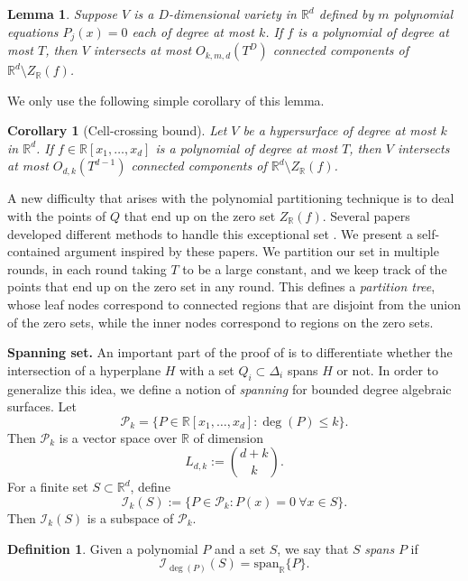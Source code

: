 \documentclass[11pt]{article}
\theoremstyle{plain}
\newtheorem{corollary}[theorem]{Corollary}
\newtheorem{lemma}[theorem]{Lemma}
\theoremstyle{definition}
\newtheorem{definition}{Definition}
\begin{document}
	\begin{lemma}
		Suppose $V$ is a $D$-dimensional variety in $\mathbb{R}^d$ defined by $m$
		polynomial equations $P_j (x) = 0$ each of degree at most $k$. If $f$ is a polynomial of degree at most $T$, then $V$ intersects at most $O_{k,m,d}(T^D)$ connected components of $\mathbb{R}^d\setminus Z_{\mathbb{R}}(f)$.
	\end{lemma}
	
	We only use the following simple corollary of this lemma.
	
	\begin{corollary}[Cell-crossing bound]\label{lemma:cell_crossing}
		Let $V$ be a hypersurface of degree at most $k$ in $\mathbb{R}^d$. If $f\in \mathbb{R}[x_1,\dots,x_d]$ is a polynomial of degree at most $T$, then $V$ intersects at most $O_{d,k}(T^{d-1})$ connected components of $\mathbb{R}^d\setminus Z_{\mathbb{R}}(f)$.  
	\end{corollary}
	
	A new difficulty that arises with the polynomial partitioning technique is to deal with the points of $Q$ that end up on the zero set $Z_{\mathbb{R}}(f)$. Several papers developed different methods to handle this exceptional set \cite{FPSSZ,MP,TY}. We present a self-contained argument inspired by these papers. We partition our set in multiple rounds, in each round taking $T$ to be a large constant, and we keep track of the points that end up on the zero set in any round. This defines a \emph{partition tree}, whose leaf nodes correspond to connected regions that are disjoint from the union of the zero sets, while the inner nodes correspond to regions on the zero sets. 
	
	\bigskip
	
	\noindent
	\textbf{Spanning set.} An important part of the proof of  is to differentiate whether the intersection of a hyperplane $H$ with a set $Q_i\subset \Delta_i$ spans $H$ or not. In order to generalize this idea, we define a notion of \emph{spanning} for bounded degree algebraic surfaces. Let
	$$\mathcal{P}_{k}=\{ P\in \mathbb{R}[x_1,\dots,x_d] :\deg(P)\leq k\}.$$
	Then $\mathcal{P}_k$ is a vector space over $\mathbb{R}$ of dimension $$L_{d,k}:=\binom{d+k}{k}.$$
	For a finite set $S\subset \mathbb{R}^d$, define 
	$$\mathcal{I}_k(S):=\{P\in \mathcal{P}_k: P(x)=0\ \forall x\in S\}.$$
    Then $\mathcal{I}_k(S)$ is a subspace of $\mathcal{P}_k$.	
	\begin{definition}
		Given a polynomial $P$ and a set $S$, we say that $S$ \emph{spans} $P$ if 
		$$\mathcal{I}_{\deg(P)}(S)=\mbox{span}_{\mathbb{R}}\{P\}.$$
	\end{definition}
\end{document}
